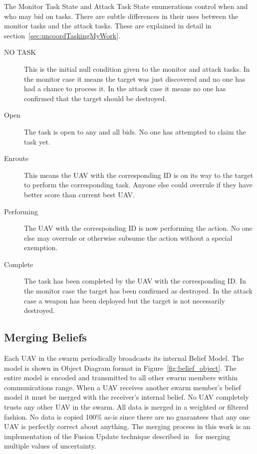 The Monitor Task State and Attack Task State enumerations control when and who may bid on tasks.  There are subtle differences in their uses between the monitor tasks and the attack tasks.  These are explained in detail in  section~\ref{sec:uncoordTaskingMyWork}.

\begin{description}
	\item [NO TASK] This is the initial null condition given to the monitor and attack tasks.  In the monitor case it means the target was just discovered and no one has had a chance to process it.  In the attack case it means no one has confirmed that the target should be destroyed.
	\item [Open] The task is open to any and all bids.  No one has attempted to claim the task yet.
	\item [Enroute] This means the UAV with the corresponding ID is on its way to the target to perform the corresponding task.  Anyone else could overrule if they have better score than current best UAV.
	\item [Performing] The UAV with the corresponding ID is now performing the action.  No one else may overrule or otherwise subsume the action without a special exemption.%
	\item [Complete] The task has been completed by the UAV with the corresponding ID.  In the monitor case the target has been confirmed as destroyed.  In the attack case a weapon has been deployed but the target is not necessarily destroyed.
\end{description}

\subsection{Merging Beliefs}
\label{sec:mergingBeliefs}
Each UAV in the swarm periodically broadcasts its internal Belief Model.  The model is shown in Object Diagram format in Figure~\ref{fig:belief_object}.  The entire model is encoded and transmitted to all other swarm members within communications range.   When a UAV receives another swarm member's belief model it must be merged with the receiver's internal belief.  No UAV completely trusts any other UAV in the swarm.  All data is merged in a weighted or filtered fashion.  No data is copied 100\% as-is since there are no guarantees that any one UAV is perfectly correct about anything.  The merging process in this work is an implementation of the Fusion Update technique described in~\textcite{shem} for merging multiple values of uncertainty.
	

